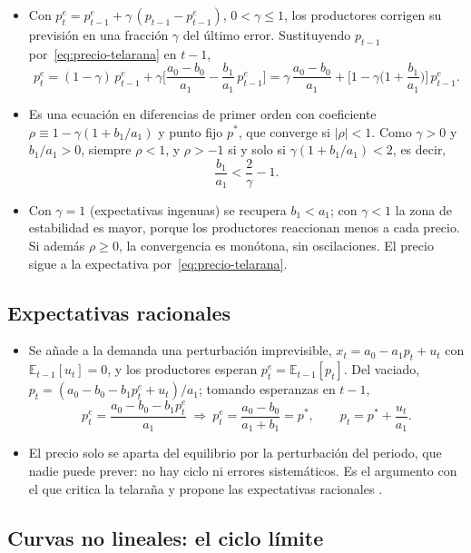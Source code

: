 \documentclass[11pt]{article}
\begin{document}
\begin{itemize}
\item Con $p^e_t=p^e_{t-1}+\gamma\,(p_{t-1}-p^e_{t-1})$, $0<\gamma\leq 1$\nocite{Nerlove1958Adaptive}, los productores corrigen su previsión en una fracción $\gamma$ del último error. Sustituyendo $p_{t-1}$ por~\eqref{eq:precio-telarana} en $t-1$,
  $$p^e_t=(1-\gamma)\,p^e_{t-1}+\gamma\Big[\frac{a_0-b_0}{a_1}-\frac{b_1}{a_1}\,p^e_{t-1}\Big]=\gamma\,\frac{a_0-b_0}{a_1}+\Big[1-\gamma\Big(1+\frac{b_1}{a_1}\Big)\Big]\,p^e_{t-1}.$$
\item Es una ecuación en diferencias de primer orden con coeficiente $\rho\equiv 1-\gamma(1+b_1/a_1)$ y punto fijo $p^*$, que converge si $\lvert\rho\rvert<1$. Como $\gamma>0$ y $b_1/a_1>0$, siempre $\rho<1$, y $\rho>-1$ si y solo si $\gamma(1+b_1/a_1)<2$, es decir,
  $$\frac{b_1}{a_1}<\frac{2}{\gamma}-1.$$
\item Con $\gamma=1$ (expectativas ingenuas) se recupera $b_1<a_1$; con $\gamma<1$ la zona de estabilidad es mayor, porque los productores reaccionan menos a cada precio. Si además $\rho\geq 0$, la convergencia es monótona, sin oscilaciones. El precio sigue a la expectativa por~\eqref{eq:precio-telarana}.
\end{itemize}
\findemo

\subsection{Expectativas racionales}\label{anexo:expectativas-racionales}

\begin{itemize}
\item Se añade a la demanda una perturbación imprevisible, $x_t=a_0-a_1p_t+u_t$ con $\mathbb{E}_{t-1}[u_t]=0$, y los productores esperan $p^e_t=\mathbb{E}_{t-1}[p_t]$\nocite{Muth1961Rational}. Del vaciado, $p_t=(a_0-b_0-b_1p^e_t+u_t)/a_1$; tomando esperanzas en $t-1$,
  $$p^e_t=\frac{a_0-b_0-b_1p^e_t}{a_1}\ \Longrightarrow\ p^e_t=\frac{a_0-b_0}{a_1+b_1}=p^*,\qquad p_t=p^*+\frac{u_t}{a_1}.$$
\item El precio solo se aparta del equilibrio por la perturbación del periodo, que nadie puede prever: no hay ciclo ni errores sistemáticos. Es el argumento con el que  critica la telaraña y propone las expectativas racionales .
\end{itemize}
\findemo

\subsection{Curvas no lineales: el ciclo límite}\label{anexo:curvas-no-lineales}
\end{document}
